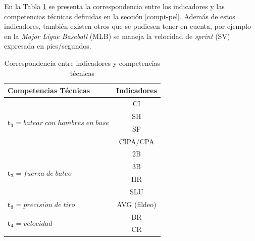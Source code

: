 \newpage
{}
\recalctypearea

En la Tabla \ref{correspondencia-pel} se presenta la correspondencia entre los indicadores y las competencias técnicas definidas en la sección \ref{compt-pel}. Además de estos indicadores, también existen otros que se pudiesen tener en cuenta, por ejemplo en la \textit{Major Ligue Baseball} (MLB) se maneja la velocidad de \textit{sprint} (SV) expresada en pies/segundos.

\begin{table} [H]
	\centering
	\caption{Correspondencia entre indicadores y competencias técnicas} \label{correspondencia-pel}
	\begin{tabular}{|l|c|}
		\hline
		\textbf{Competencias Técnicas}                                          & \textbf{Indicadores} \\ \hline
		\multirow{4}{5.4cm}{$\boldsymbol{t_1}=batear\;con\;hombres\;en\;base $} &          CI          \\
		                                                                        &          SH          \\
		                                                                        &          SF          \\
		                                                                        &       CIPA/CPA       \\ \hline
		\multirow{4}{5.4cm}{$\boldsymbol{t_2}=fuerza\;de\;bateo $}              &          2B          \\
		                                                                        &          3B          \\
		                                                                        &          HR          \\
		                                                                        &         SLU          \\ \hline
		$\boldsymbol{t_3}= precisi\acute{o}n\;de\;tiro $                        &     AVG (fildeo)     \\ \hline
		\multirow{4}{5.4cm}{$\boldsymbol{t_4}= velocidad $}                     &          BR          \\
		                                                                        &          CR          \\

\end{tabular}
\end{table}
